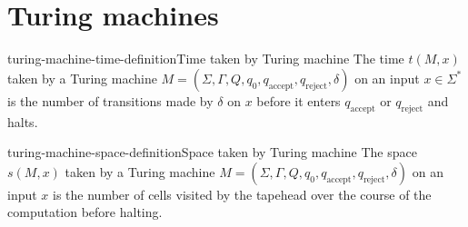 \documentclass[preview]{standalone}
\begin{document}
\genpage

\section{Turing machines}

\begin{snippetdefinition}{turing-machine-time-definition}{Time taken by Turing machine}
    The time $t(M, x)$ taken by a Turing machine $M=\left(\Sigma, \Gamma, Q, q_0, q_{\text {accept}}, q_{\text {reject}}, \delta\right)$
    on an input $x \in \Sigma^*$ is the number of transitions made by $\delta$ on $x$ before it enters $q_{\text {accept}}$ or $q_{\text {reject}}$ and halts.
\end{snippetdefinition}

\begin{snippetdefinition}{turing-machine-space-definition}{Space taken by Turing machine}
    The space $s(M, x)$ taken by a Turing machine $M=\left(\Sigma, \Gamma, Q, q_0, q_{\text {accept}}, q_{\text {reject}}, \delta\right)$
    on an input $x$ is the number of cells visited by the tapehead over the course of the computation before halting.
\end{snippetdefinition}
\end{document}
